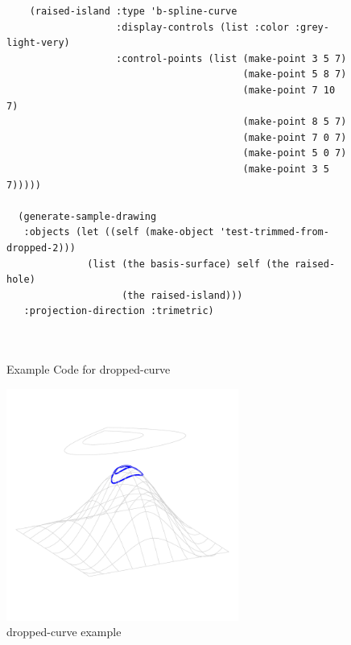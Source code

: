 \documentclass [11pt]{book}
\begin{document}
\begin{itemize}
\begin{figure}
\begin{lrbox}{\boxedverb}
\begin{minipage}{\linewidth}
{\begin{verbatim}
    (raised-island :type 'b-spline-curve
                   :display-controls (list :color :grey-light-very)
                   :control-points (list (make-point 3 5 7) 
                                         (make-point 5 8 7) 
                                         (make-point 7 10 7) 
                                         (make-point 8 5 7) 
                                         (make-point 7 0 7) 
                                         (make-point 5 0 7) 
                                         (make-point 3 5 7)))))

  (generate-sample-drawing 
   :objects (let ((self (make-object 'test-trimmed-from-dropped-2)))
              (list (the basis-surface) self (the raised-hole) 
                    (the raised-island)))
   :projection-direction :trimetric)

 

\end{verbatim}}
\end{minipage}
\end{lrbox}
\fbox{\usebox{\boxedverb}}

\caption{Example Code for dropped-curve}

\label{fig:example-code-dropped-curve}

\end{figure}

\begin{figure}
\begin{center}
\includegraphics[width=3in,height=3in]{../images/example-dropped-curve.pdf}
\end{center}

\caption{dropped-curve example}

\label{fig:dropped-curve}

\end{figure}






\end{itemize}
\end{document}

